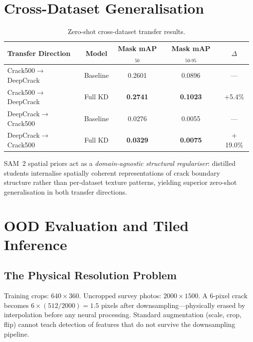 \documentclass[12pt,a4paper]{article}
\begin{document}
\section{Cross-Dataset Generalisation}
\label{sec:crossdataset}

\begin{table}[H]\centering
\caption{Zero-shot cross-dataset transfer results.}
\label{tab:cross}
\begin{tabular}{lcccc}
\toprule
Transfer Direction & Model & Mask mAP$_{50}$ & Mask mAP$_{50\text{-}95}$ & $\Delta$ \\
\midrule
Crack500$\to$DeepCrack & Baseline & 0.2601 & 0.0896 & --- \\
Crack500$\to$DeepCrack & Full KD  & \textbf{0.2741} & \textbf{0.1023} & $+$5.4\% \\
\midrule
DeepCrack$\to$Crack500 & Baseline & 0.0276 & 0.0055 & --- \\
DeepCrack$\to$Crack500 & Full KD  & \textbf{0.0329} & \textbf{0.0075} & $+$19.0\% \\
\bottomrule
\end{tabular}
\end{table}

SAM~2 spatial priors act as a \emph{domain-agnostic structural regulariser}:
distilled students internalise spatially coherent representations of crack
boundary structure rather than per-dataset texture patterns, yielding superior
zero-shot generalisation in both transfer directions.

\section{OOD Evaluation and Tiled Inference}
\label{sec:ood}

\subsection{The Physical Resolution Problem}

Training crops: $640\times360$.
Uncropped survey photos: $2000\times1500$.
A 6-pixel crack becomes $6\times(512/2000)=1.5$ pixels after
downsampling---physically erased by interpolation before any neural processing.
Standard augmentation (scale, crop, flip) cannot teach detection of features
that do not survive the downsampling pipeline.
\end{document}
